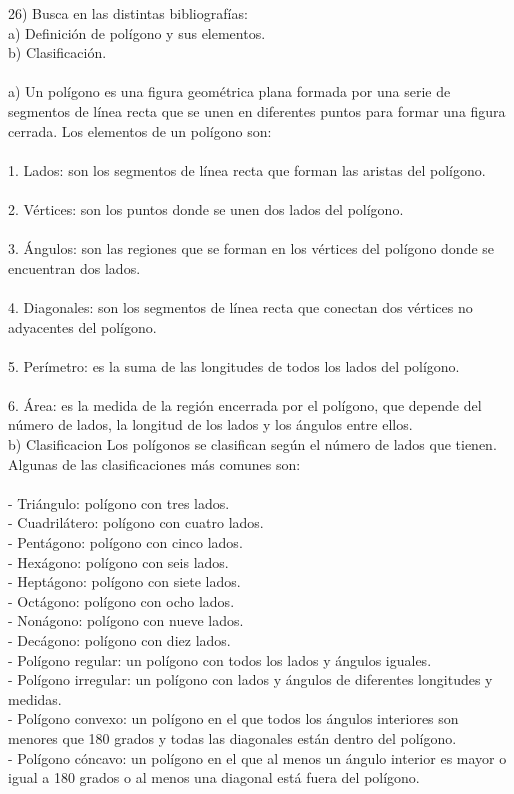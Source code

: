 \documentclass{article}
\begin{document}
26) Busca en las distintas bibliografías:\\
a) Definición de polígono y sus elementos.\\
b) Clasificación.\\
\\
a) Un polígono es una figura geométrica plana formada por una serie de segmentos de línea recta que se unen en diferentes puntos para formar una figura cerrada. Los elementos de un polígono son:\\
\\
1. Lados: son los segmentos de línea recta que forman las aristas del polígono.\\
\\
2. Vértices: son los puntos donde se unen dos lados del polígono.\\
\\
3. Ángulos: son las regiones que se forman en los vértices del polígono donde se encuentran dos lados.\\
\\
4. Diagonales: son los segmentos de línea recta que conectan dos vértices no adyacentes del polígono.\\
\\
5. Perímetro: es la suma de las longitudes de todos los lados del polígono.\\
\\
6. Área: es la medida de la región encerrada por el polígono, que depende del número de lados, la longitud de los lados y los ángulos entre ellos.\\

b) Clasificacion
Los polígonos se clasifican según el número de lados que tienen. Algunas de las clasificaciones más comunes son:\\
\\
- Triángulo: polígono con tres lados.\\
- Cuadrilátero: polígono con cuatro lados.\\
- Pentágono: polígono con cinco lados.\\
- Hexágono: polígono con seis lados.\\
- Heptágono: polígono con siete lados.\\
- Octágono: polígono con ocho lados.\\
- Nonágono: polígono con nueve lados.\\
- Decágono: polígono con diez lados.\\
- Polígono regular: un polígono con todos los lados y ángulos iguales.\\
- Polígono irregular: un polígono con lados y ángulos de diferentes longitudes y medidas.\\
- Polígono convexo: un polígono en el que todos los ángulos interiores son menores que 180 grados y todas las diagonales están dentro del polígono.\\
- Polígono cóncavo: un polígono en el que al menos un ángulo interior es mayor o igual a 180 grados o al menos una diagonal está fuera del polígono.\\
\\
\end{document}
